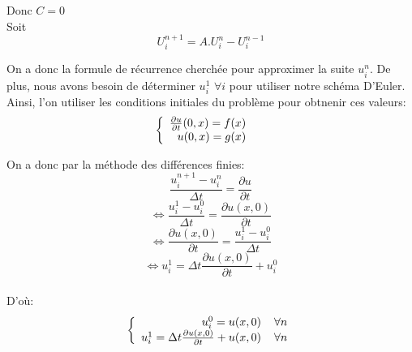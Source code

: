 Donc $C = 0$\\

Soit
\begin{equation*}
\boxed{
U^{n+1}_i = A.U^{n}_i - U^{n-1}_i}
\end{equation*}

On a donc la formule de récurrence cherchée pour approximer la suite $u^n_i$.
\newline
\newline
De plus, nous avons besoin de déterminer $u^1_i$ $\forall i$ pour utiliser notre schéma D'Euler. Ainsi, l'on utiliser les conditions initiales du problème pour obtnenir ces valeurs:
\begin{equation*}
\left \{
\begin{array}{rcl}
\frac{\partial u}{\partial t} (0,x) = f(x)\hspace*{4 mm}\\
 u(0,x) = g(x) \hspace*{4 mm} \\
\end{array}
\right.
\end{equation*}

On a donc par la méthode des différences finies:
\begin{equation*}
\frac{u^{n+1}_{i} - u^{n}_{i}}{\Delta t} = \frac{\partial u}{\partial t}
\end{equation*}
\begin{equation*}
\Leftrightarrow \frac{u^{1}_{i} - u^{0}_{i}}{\Delta t} = \frac{\partial u(x,0)}{\partial t}
\end{equation*}
\begin{equation*}
\Leftrightarrow \frac{\partial u(x,0)}{\partial t} = \frac{u^{1}_{i} - u^{0}_{i}}{\Delta t}
\end{equation*}
\begin{equation*}
\Leftrightarrow u^{1}_{i} = \Delta t \frac{\partial u(x,0)}{\partial t} + u^{0}_{i}
\end{equation*}\\
D'où:
\begin{equation*}
\left \{
\begin{array}{rcl}
u^0_i = u(x,0) \hspace*{4 mm} \forall n\\
u^1_i = \Delta t \frac{\partial u(x,0)}{\partial t} + u(x,0) \hspace*{4 mm} \forall n\\
\end{array}
\right.
\end{equation*}

